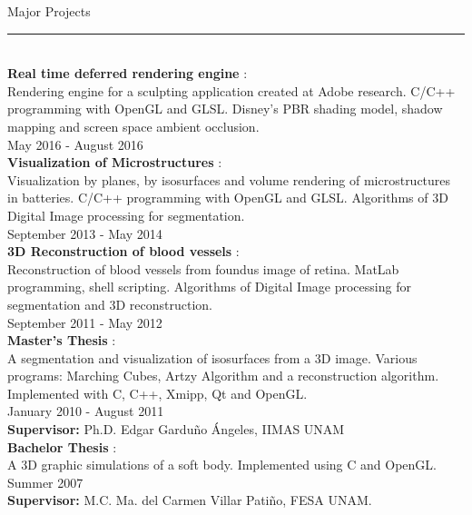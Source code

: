 \documentclass[letterpaper,10pt]{article}
\begin{document}
\begin{minipage}{0.4\textwidth} 
\vspace*{-3.0cm}
{\large{Major Projects}} \\
\textcolor{Dandelion}{\rule{0.5\textwidth}{0.05in}} \\

\textbf{Real time deferred rendering engine} : \\
Rendering engine for a sculpting application created at Adobe research.
C/C++ programming with OpenGL and GLSL.
Disney's PBR shading model, shadow mapping and screen space ambient occlusion.\\
May 2016 -  August 2016\\

\textbf{Visualization of Microstructures} : \\
Visualization by planes, by isosurfaces and volume rendering of microstructures in batteries.
C/C++ programming with OpenGL and GLSL.
Algorithms of 3D Digital Image processing for segmentation.\\
September 2013 -  May 2014\\

\textbf{3D Reconstruction of blood vessels} : \\
Reconstruction of blood vessels from foundus image of retina.
MatLab programming, shell scripting.
Algorithms of Digital Image processing for segmentation and 3D reconstruction.\\
September 2011 -  May 2012\\

\textbf{Master's Thesis} : \\
A segmentation and visualization of isosurfaces from a 3D image. Various programs: Marching Cubes,  Artzy Algorithm and  a reconstruction algorithm. Implemented with C, C++, Xmipp, Qt and OpenGL.\\
January 2010 - August 2011 \\
\textbf{Supervisor:} Ph.D. Edgar Gardu\~{n}o \'{A}ngeles, IIMAS UNAM \\

\textbf{Bachelor Thesis} : \\
A 3D graphic simulations of a soft body. Implemented using C and OpenGL. \\
Summer 2007 \\
\textbf{Supervisor:} M.C. Ma. del Carmen Villar Pati\~{n}o, FESA UNAM. \\

\vspace*{1.5cm}


\end{minipage}
\end{document}
